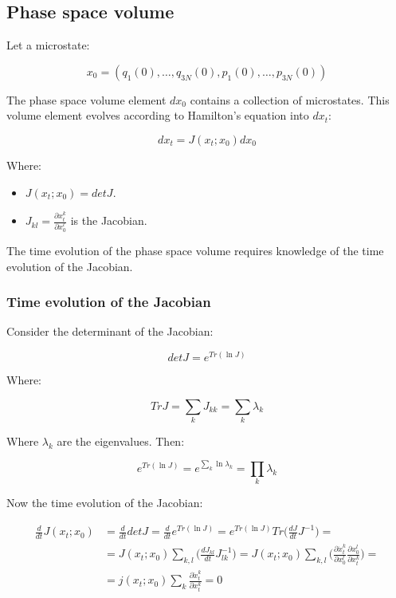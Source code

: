 	\subsection{Phase space volume}
	Let a microstate:

	$$x_0 = (q_1(0), \dots, q_{3N}(0), p_1(0), \dots, p_{3N}(0))$$

	The phase space volume element $dx_0$ contains a collection of microstates.
	This volume element evolves according to Hamilton's equation into $dx_t$:

	$$dx_t = J(x_t;x_0)dx_0$$

	Where:

	\begin{multicols}{2}
		\begin{itemize}
			\item $J(x_t;x_0) = det J$.
			\item $J_{kl} = \frac{\partial x_t^k}{\partial x_0^l}$ is the Jacobian.
		\end{itemize}
	\end{multicols}

	The time evolution of the phase space volume requires knowledge of the time evolution of the Jacobian.

		\subsubsection{Time evolution of the Jacobian}
		Consider the determinant of the Jacobian:

		$$det J = e^{Tr(\ln J)}$$

		Where:

		$$Tr J = \sum\limits_k J_{kk} = \sum\limits_k\lambda_k$$

		Where $\lambda_k$ are the eigenvalues.
		Then:

		$$e^{Tr(\ln J)} = e^{\sum\limits_k\ln\lambda_k} = \prod\limits_k\lambda_k$$

		Now the time evolution of the Jacobian:

		\begin{align*}
			\frac{d}{dt}J(x_t;x_0) &= \frac{d}{dt} det J = \frac{d}{dt}e^{Tr(\ln J)} = e^{Tr(\ln J)}Tr\biggl(\frac{dJ}{dt}J^{-1}\biggr) = \\
														 &= J(x_t;x_0)\sum\limits_{k, l}\biggl(\frac{d J_{kl}}{dt}J_{lk}^{-1}\biggr) = J(x_t;x_0)\sum\limits_{k,l}\biggl(\frac{\partial\dot{x}_t^k}{\partial x_0^l}\frac{\partial x_0^l}{\partial x_t^k}\biggr) =\\
														 &=j(x_t;x_0)\sum\limits_k\frac{\partial\dot{x}_t^k}{\partial x_t^k} = 0
		\end{align*}

